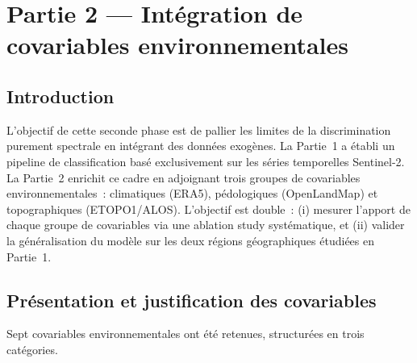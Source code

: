 
\chapter{Partie 2 — Intégration de covariables environnementales}

\section{Introduction}
L'objectif de cette seconde phase est de pallier les limites de la discrimination
purement spectrale en intégrant des données exogènes. La Partie~1 a établi un
pipeline de classification basé exclusivement sur les séries temporelles Sentinel-2.
La Partie~2 enrichit ce cadre en adjoignant trois groupes de covariables
environnementales~: climatiques (ERA5), pédologiques (OpenLandMap) et
topographiques (ETOPO1/ALOS). L'objectif est double~: (i) mesurer l'apport de
chaque groupe de covariables via une ablation study systématique, et (ii) valider
la généralisation du modèle sur les deux régions géographiques étudiées en Partie~1.

\section{Présentation et justification des covariables}

Sept covariables environnementales ont été retenues, structurées en trois catégories.

